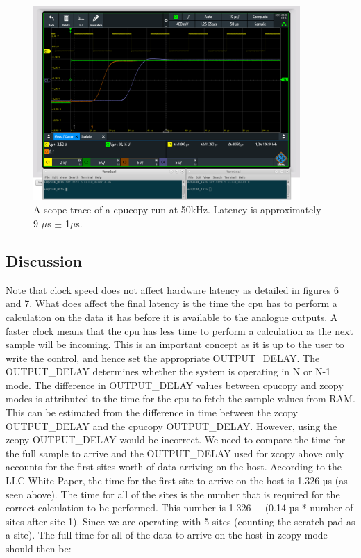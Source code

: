 \documentclass{article}
\begin{document}
\begin{figure}
	\centering
	\includegraphics[width=4.0in]{images/50kHz_annotated_scope_cpucopy.png}
	\caption{A scope trace of a cpucopy run at 50kHz. Latency is approximately  9 $\mu$s $\pm$ 1$\mu$s.}
	\label{cpu50scope}
\end{figure}

\subsection{Discussion}
Note that clock speed does not affect hardware latency as detailed in figures 6 and 7.
What does affect the final latency is the time the cpu has to perform a calculation on the data it has before it is available to the analogue outputs.
A faster clock means that the cpu has less time to perform a calculation as the next sample will be incoming.
This is an important concept as it is up to the user to write the control, and hence set the appropriate OUTPUT\_DELAY.
The OUTPUT\_DELAY determines whether the system is operating in N or N-1 mode.
The difference in OUTPUT\_DELAY values between cpucopy and zcopy modes is attributed to the time for the cpu to fetch the sample values from RAM.
This can be estimated from the difference in time between the zcopy OUTPUT\_DELAY and the cpucopy OUTPUT\_DELAY.
However, using the zcopy OUTPUT\_DELAY would be incorrect.
We need to compare the time for the full sample to arrive and the OUTPUT\_DELAY used for zcopy above only accounts for the first sites worth of data arriving on the host.
According to the LLC White Paper, the time for the first site to arrive on the host is 1.326 µs (as seen above).
The time for all of the sites is the number that is required for the correct calculation to be performed.
This number is 1.326 + (0.14 µs * number of sites after site 1). Since we are operating with 5 sites (counting the scratch pad as a site).
The full time for all of the data to arrive on the host in zcopy mode should then be:
\end{document}
